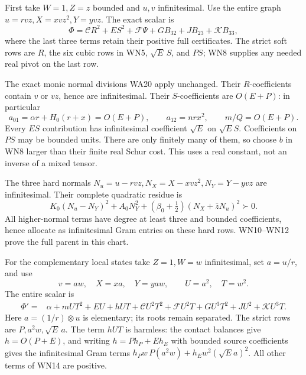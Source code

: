 First take \(W=1,Z=z\) bounded and \(u,v\) infinitesimal. Use the
entire graph \(u=rvz,X=xvz^2,Y=yvz\). The exact scalar is
\[
 \Phi=\mathcal CR^2+ES^2+\mathcal F\Psi
          +GB_{32}+JB_{23}+\mathcal K B_{33},
 \tag{WN10}
\]
where the last three terms retain their positive full certificates.
The strict soft rows are \(R\), the six cubic rows in WN5,
\(\sqrt E\,S\), and \(PS\); WN8 supplies any needed real pivot
on the last row.

The exact monic normal divisions WA20 apply unchanged.
Their \(R\)-coefficients contain \(v\) or \(vz\), hence are
infinitesimal. Their \(S\)-coefficients are \(O(E+P)\):
in particular
\[
 a_{01}=\alpha r+H_0(r+x)=O(E+P),\qquad
 a_{12}=nr x^2,\qquad m/Q=O(E+P).
 \tag{WN11}
\]
Every \(ES\) contribution has infinitesimal coefficient \(\sqrt E\)
on \(\sqrt E S\). Coefficients on \(PS\) may be bounded units.
There are only finitely many of them, so choose \(b\) in WN8
larger than their finite real Schur cost. This uses a real constant,
not an inverse of a mixed tensor.

The three hard normals
\(N_u=u-rvz,N_X=X-xvz^2,N_Y=Y-yvz\) are infinitesimal.
Their complete quadratic residue is
\[
 K_0(N_u-N_Y)^2+A_0N_Y^2+
          (\beta_0+\tfrac12)(N_X+\bar zN_u)^2\succ0.
 \tag{WN12}
\]
All higher-normal terms have degree at least three and bounded
coefficients, hence allocate as infinitesimal Gram entries on these
hard rows. WN10--WN12 prove the full parent in this chart.

For the complementary local states take \(Z=1,W=w\) infinitesimal,
set \(a=u/r\), and use
\[
 v=aw,\quad X=xa,\quad Y=yaw,\qquad U=a^2,\quad T=w^2.
 \tag{WN13}
\]
The entire scalar is
\[
\begin{split}
 \Phi'={}&\alpha+mUT^2+EU+hUT+\mathcal C U^2T^2
       +\mathcal F U^2T+GU^3T^2+JU^2+\mathcal K U^3T .
\end{split}\tag{WN14}
\]
Here \(a=(1/r)\otimes u\) is elementary; its roots remain separated.
The strict rows are \(P,a^2w,\sqrt E\,a\).
The term \(hUT\) is harmless: the contact balances give
\(h=O(P+E)\), and writing \(h=Ph_P+Eh_E\) with bounded source
coefficients gives the infinitesimal Gram terms
\(h_Pw\,P(a^2w)+h_Ew^2(\sqrt E a)^2\).
All other terms of WN14 are positive.

